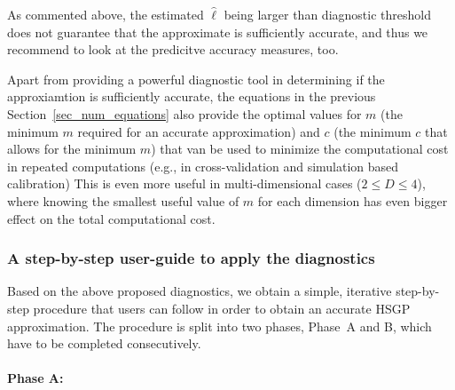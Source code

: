 As commented above, the estimated $\hat{\ell}$ being larger than diagnostic threshold does not guarantee that the approximate is sufficiently accurate, and thus we recommend to look at the predicitve accuracy measures, too.

Apart from providing a powerful diagnostic tool in determining if the approxiamtion is sufficiently accurate, the equations in the previous Section~\ref{sec_num_equations} also provide the optimal values for $m$ (the minimum $m$ required for an accurate approximation) and $c$ (the minimum $c$ that allows for the minimum $m$) that van be used to minimize the computational cost in repeated computations (e.g., in cross-validation and simulation based calibration)
This is even more useful in multi-dimensional cases ($2 \leq D \leq 4$), where knowing the smallest useful value of $m$ for each dimension has even bigger effect on the total computational cost.

\subsubsection{A step-by-step user-guide to apply the diagnostics} \label{sec_user_guide}

Based on the above proposed diagnostics, we obtain a simple, iterative step-by-step procedure that users can follow in order to obtain an accurate HSGP approximation. The procedure is split into two phases, Phase~A and B, which have to be completed consecutively.

\paragraph*{Phase A:}

